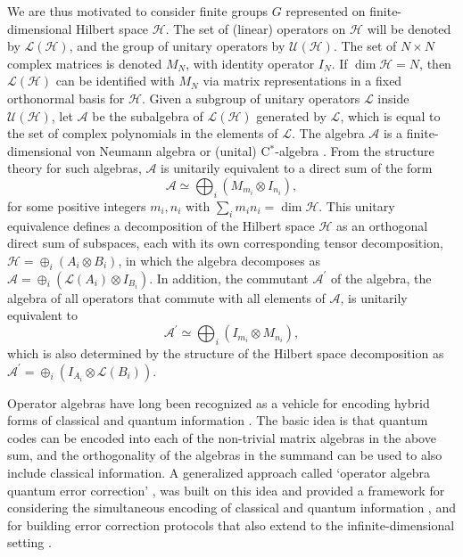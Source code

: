 \documentclass[11pt]{article}
\theoremstyle{definition}
\newcommand{\calL}{\mathcal{L}}
\begin{document}
We are thus motivated to consider finite groups $G$ represented on finite-dimensional Hilbert space $\mathcal H$. The set of (linear) operators on $\mathcal H$ will be denoted by $\mathcal L(\mathcal H)$, and the group of unitary operators by $\mathcal U(\mathcal H)$. The set of $N\times N$ complex matrices is denoted $M_N$, with identity operator $I_N$. If $\dim \mathcal H = N$, then $\mathcal L(\mathcal H)$ can be identified with $M_N$ via matrix representations in a fixed orthonormal basis for $\mathcal H$. 
Given a subgroup of unitary operators $\mathcal L$ inside $\mathcal U(\mathcal H)$, let  $\mathcal A$ be the subalgebra of $\mathcal L(\mathcal H)$ generated by $\mathcal L$, which is equal to the set of complex polynomials in the elements of $\mathcal L$. The algebra $\mathcal A$ is a finite-dimensional von Neumann algebra or (unital) C$^*$-algebra \cite{davidson1996c,paulsen2002completely}. From the structure theory for such algebras, $\mathcal A$ is unitarily equivalent to a direct sum of the form 
\[
\mathcal A \simeq \bigoplus_i (M_{m_i} \otimes I_{n_i}), 
\]
for some positive integers $m_i, n_i$  with $\sum_i m_i n_i = \dim \mathcal H$. This unitary equivalence defines a decomposition of the Hilbert space $\mathcal H$ as an orthogonal direct sum of subspaces, each with its own corresponding tensor decomposition, $\mathcal H = \oplus_i (A_i \otimes B_i)$, in which the algebra decomposes as $\mathcal A = \oplus_i (\calL(A_i) \otimes I_{B_i})$. In addition, the commutant $\mathcal A^\prime$ of the algebra, the algebra of all operators that commute with all elements of $\mathcal A$, is unitarily equivalent to 
\[
    \mathcal A^\prime \simeq \bigoplus_i (I_{m_i} \otimes M_{n_i}), 
\] 
which is also determined by the structure of the Hilbert space decomposition as ${\mathcal A}^\prime = \oplus_i (I_{A_i} \otimes \calL(B_i))$. 

Operator algebras have long been recognized as a vehicle for encoding hybrid forms of classical and quantum information \cite{kuperberg2003capacity}.
The basic idea is that quantum codes can be encoded into each of the non-trivial matrix algebras in the above sum, and the orthogonality of the algebras in the summand can be used to also include classical information. 
A generalized approach called `operator algebra quantum error correction' \cite{Beny2007Generalization,Beny2007Quantum}, was built on this idea and provided a framework for considering the simultaneous encoding of classical and quantum information \cite{devetak2005capacity,hsieh2010entanglement,hsieh2010trading,grassl2017codes,li2020error,cao2021higher,nemec2021infinite,majidy2018unification}, and for building error correction protocols that also extend to the infinite-dimensional setting \cite{beny2009quantum,crann2016private}. 
\end{document}
